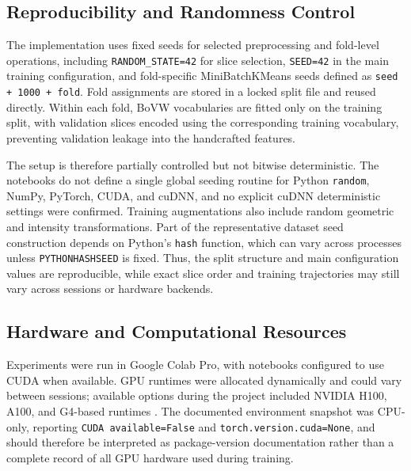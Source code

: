 \subsection{Reproducibility and Randomness Control}
\label{sec:reproducibility_randomness_control}
The implementation uses fixed seeds for selected preprocessing and fold-level operations, including \texttt{RANDOM\_STATE=42} for slice selection, \texttt{SEED=42} in the main training configuration, and fold-specific MiniBatchKMeans seeds defined as \texttt{seed + 1000 + fold}. Fold assignments are stored in a locked split file and reused directly. Within each fold, BoVW vocabularies are fitted only on the training split, with validation slices encoded using the corresponding training vocabulary, preventing validation leakage into the handcrafted features.

The setup is therefore partially controlled but not bitwise deterministic. The notebooks do not define a single global seeding routine for Python \texttt{random}, NumPy, PyTorch, CUDA, and cuDNN, and no explicit cuDNN deterministic settings were confirmed. Training augmentations also include random geometric and intensity transformations. Part of the representative dataset seed construction depends on Python's \texttt{hash} function, which can vary across processes unless \texttt{PYTHONHASHSEED} is fixed. Thus, the split structure and main configuration values are reproducible, while exact slice order and training trajectories may still vary across sessions or hardware backends.


\subsection{Hardware and Computational Resources}
\label{sec:hardware_computational_resources}
Experiments were run in Google Colab Pro, with notebooks configured to use CUDA when available. GPU runtimes were allocated dynamically and could vary between sessions; available options during the project included NVIDIA H100, A100, and G4-based runtimes \cite{nvidia2024h100,nvidia2024a100,googlecloud2025g4gpu}. The documented environment snapshot was CPU-only, reporting \texttt{CUDA available=False} and \texttt{torch.version.cuda=None}, and should therefore be interpreted as package-version documentation rather than a complete record of all GPU hardware used during training.
